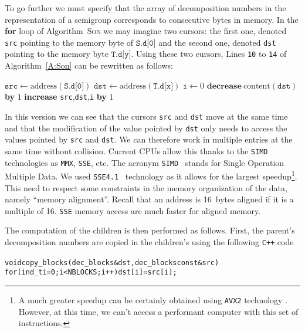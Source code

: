 \documentclass[reqno]{amsart}
\theoremstyle{plain}
\theoremstyle{definition}
\newcommand{\CPP}{\texttt{C++}\xspace}
\renewcommand{\leq}{\leqslant}
\newcommand{\MMX}{\texttt{MMX}\xspace}
\newcommand{\SIMD}{\texttt{SIMD}\xspace}
\newcommand{\SSE}{\texttt{SSE}\xspace}
\newcommand{\SSEV}{\texttt{SSE4.1}\xspace}
\renewcommand{\tt}[1]{\texttt{#1}}
\begin{document}
To go further we must specify that the array of decomposition numbers in the
representation of a semigroup corresponds to consecutive bytes in memory. In
the \textbf{for} loop of Algorithm~\textsc{Son} we may imagine two cursors:
the first one, denoted \texttt{src} pointing to the memory byte of
$\texttt{S.d[0]}$ and the second one, denoted \texttt{dst} pointing to the
memory byte $\texttt{T.d[y]}$.  Using these two cursors, Lines \tt{10} to
\tt{14} of Algorithm~\ref{A:Son} can be rewritten as follows:

\vspace{1em}
\small
\begin{algorithmic}
\State $\tt{src}\gets \text{address}(\tt{S.d[0]})$
\State $\tt{dst}\gets \text{address}(\tt{T.d[x]})$
\State $\tt{i}\gets 0$
\While{$\tt{i}\leq \tt{3G}-\tt{x}$}
\If{$\text{content}(\tt{src})>0$}
\State $\textbf{decrease}\ \text{content}(\tt{dst})$ \textbf{by} $1$\EndIf
\State \textbf{increase} \tt{src},\tt{dst},\tt{i} \textbf{by} $1$
\EndWhile
\end{algorithmic}
\vspace{1em}

\noindent In this version we can see that the cursors \texttt{src} and
\texttt{dst} move at the same time and that the modification of the value
pointed by \texttt{dst} only needs to access the values pointed by \tt{src}
and \tt{dst}.  We can therefore work in multiple entries at the same time
without collision.  Current CPUs allow this thanks to the \SIMD technologies as
\MMX, \SSE, etc.  The acronym \SIMD~\cite{WikipediaSIMD} stands for Single Operation Multiple Data.  
We used \SSEV~\cite{WikipediaSSE, IntelSSE} technology as it allows for the largest speedup\footnote{A much greater  speedup can be certainly obtained using \texttt{AVX2} technology \cite{AVX2}. However, at this time, we can't access a performant computer with this set of instructions.}.  
This need to respect some constraints in the memory
organization of the data, namely ``memory alignment''. Recall that an address
is 16~bytes aligned if it is a multiple of 16. \SSE memory access are much
faster for aligned memory.


The computation of the children is then performed as follows. First, the
parent's decomposition numbers are copied in the children's using the
following \CPP code
\vspace{1em}
{
\small
\begin{alltt}
void copy_blocks(dec_blocks &dst, dec_blocks const &src) {
  for (ind_t i=0; i<NBLOCKS; i++) dst[i] = src[i];
}
\end{alltt}}
\vspace{1em}
\end{document}
